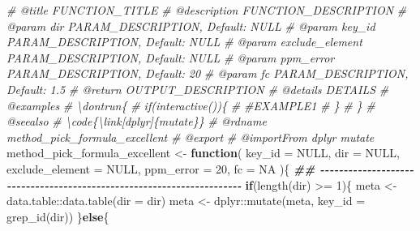 \documentclass[
]{article}
\newenvironment{Shaded}{\begin{snugshade}}{\end{snugshade}}
\newcommand{\AttributeTok}[1]{\textcolor[rgb]{0.77,0.63,0.00}{#1}}
\newcommand{\CommentTok}[1]{\textcolor[rgb]{0.56,0.35,0.01}{\textit{#1}}}
\newcommand{\ConstantTok}[1]{\textcolor[rgb]{0.00,0.00,0.00}{#1}}
\newcommand{\ControlFlowTok}[1]{\textcolor[rgb]{0.13,0.29,0.53}{\textbf{#1}}}
\newcommand{\DecValTok}[1]{\textcolor[rgb]{0.00,0.00,0.81}{#1}}
\newcommand{\DocumentationTok}[1]{\textcolor[rgb]{0.56,0.35,0.01}{\textbf{\textit{#1}}}}
\newcommand{\FunctionTok}[1]{\textcolor[rgb]{0.00,0.00,0.00}{#1}}
\newcommand{\NormalTok}[1]{#1}
\newcommand{\OtherTok}[1]{\textcolor[rgb]{0.56,0.35,0.01}{#1}}
\newcommand{\SpecialCharTok}[1]{\textcolor[rgb]{0.00,0.00,0.00}{#1}}
\begin{document}
\begin{Shaded}
\begin{Highlighting}[]
\CommentTok{\#\textquotesingle{} @title FUNCTION\_TITLE}
\CommentTok{\#\textquotesingle{} @description FUNCTION\_DESCRIPTION}
\CommentTok{\#\textquotesingle{} @param dir PARAM\_DESCRIPTION, Default: NULL}
\CommentTok{\#\textquotesingle{} @param key\_id PARAM\_DESCRIPTION, Default: NULL}
\CommentTok{\#\textquotesingle{} @param exclude\_element PARAM\_DESCRIPTION, Default: NULL}
\CommentTok{\#\textquotesingle{} @param ppm\_error PARAM\_DESCRIPTION, Default: 20}
\CommentTok{\#\textquotesingle{} @param fc PARAM\_DESCRIPTION, Default: 1.5}
\CommentTok{\#\textquotesingle{} @return OUTPUT\_DESCRIPTION}
\CommentTok{\#\textquotesingle{} @details DETAILS}
\CommentTok{\#\textquotesingle{} @examples }
\CommentTok{\#\textquotesingle{} \textbackslash{}dontrun\{}
\CommentTok{\#\textquotesingle{} if(interactive())\{}
\CommentTok{\#\textquotesingle{}  \#EXAMPLE1}
\CommentTok{\#\textquotesingle{}  \}}
\CommentTok{\#\textquotesingle{} \}}
\CommentTok{\#\textquotesingle{} @seealso }
\CommentTok{\#\textquotesingle{}  \textbackslash{}code\{\textbackslash{}link[dplyr]\{mutate\}\}}
\CommentTok{\#\textquotesingle{} @rdname method\_pick\_formula\_excellent}
\CommentTok{\#\textquotesingle{} @export }
\CommentTok{\#\textquotesingle{} @importFrom dplyr mutate}
\NormalTok{method\_pick\_formula\_excellent }\OtherTok{\textless{}{-}} 
  \ControlFlowTok{function}\NormalTok{(}
           \AttributeTok{key\_id =} \ConstantTok{NULL}\NormalTok{, }
           \AttributeTok{dir =} \ConstantTok{NULL}\NormalTok{,}
           \AttributeTok{exclude\_element =} \ConstantTok{NULL}\NormalTok{,}
           \AttributeTok{ppm\_error =} \DecValTok{20}\NormalTok{,}
           \AttributeTok{fc =} \ConstantTok{NA}
\NormalTok{           )\{}
    \DocumentationTok{\#\# {-}{-}{-}{-}{-}{-}{-}{-}{-}{-}{-}{-}{-}{-}{-}{-}{-}{-}{-}{-}{-}{-}{-}{-}{-}{-}{-}{-}{-}{-}{-}{-}{-}{-}{-}{-}{-}{-}{-}{-}{-}{-}{-}{-}{-}{-}{-}{-}{-}{-}{-}{-}{-}{-}{-}{-}{-}{-}{-}{-}{-}{-}{-}{-}{-}{-}{-}{-}{-}{-}}
    \ControlFlowTok{if}\NormalTok{(}\FunctionTok{length}\NormalTok{(dir) }\SpecialCharTok{\textgreater{}=} \DecValTok{1}\NormalTok{)\{}
\NormalTok{      meta }\OtherTok{\textless{}{-}}\NormalTok{ data.table}\SpecialCharTok{::}\FunctionTok{data.table}\NormalTok{(}\AttributeTok{dir =}\NormalTok{ dir)}
\NormalTok{      meta }\OtherTok{\textless{}{-}}\NormalTok{ dplyr}\SpecialCharTok{::}\FunctionTok{mutate}\NormalTok{(meta, }\AttributeTok{key\_id =} \FunctionTok{grep\_id}\NormalTok{(dir))}
\NormalTok{    \}}\ControlFlowTok{else}\NormalTok{\{}

\end{Highlighting}
\end{Shaded}
\end{document}
